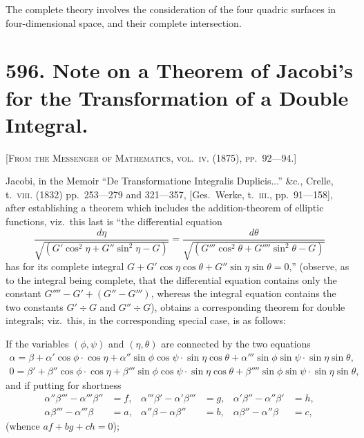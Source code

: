 \documentclass[11pt,a4paper]{book}
\begin{document}
The complete theory involves the consideration of the four quadric surfaces in four-dimensional space, and their complete intersection.

\newpage

\section*{596. Note on a Theorem of Jacobi's for the Transformation of a Double Integral.}

\noindent\textsc{[From the Messenger of Mathematics, vol.~\textsc{iv}. (1875), pp.~92---94.]}

\medskip

\noindent Jacobi, in the Memoir ``De Transformatione Integralis Duplicis...'' \&c., Crelle, t.~\textsc{viii}. (1832) pp.~253---279 and 321---357, [Ges.\ Werke, t.~\textsc{iii}., pp.~91---158], after establishing a theorem which includes the addition-theorem of elliptic functions, viz.\ this last is ``the differential equation
\[
\frac{d\eta}{\sqrt{(G' \cos^2 \eta + G'' \sin^2 \eta - G)}} = \frac{d\theta}{\sqrt{(G''' \cos^2 \theta + G'''' \sin^2 \theta - G)}}
\]
has for its complete integral $G + G' \cos \eta \cos \theta + G'' \sin \eta \sin \theta = 0$,'' (observe, as to the integral being complete, that the differential equation contains only the constant $G'''' - G' + (G'' - G''')$, whereas the integral equation contains the two constants $G' \div G$ and $G'' \div G$), obtains a corresponding theorem for double integrals; viz.\ this, in the corresponding special case, is as follows:

If the variables $(\phi, \psi)$ and $(\eta, \theta)$ are connected by the two equations
\begin{gather*}
\alpha = \beta + \alpha' \cos \phi \cdot \cos \eta + \alpha'' \sin \phi \cos \psi \cdot \sin \eta \cos \theta + \alpha''' \sin \phi \sin \psi \cdot \sin \eta \sin \theta, \\
0 = \beta' + \beta'' \cos \phi \cdot \cos \eta + \beta''' \sin \phi \cos \psi \cdot \sin \eta \cos \theta + \beta'''' \sin \phi \sin \psi \cdot \sin \eta \sin \theta,
\end{gather*}
and if putting for shortness
\begin{align*}
\alpha'' \beta''' - \alpha''' \beta'' &= f, & \alpha''' \beta' - \alpha' \beta''' &= g, & \alpha' \beta'' - \alpha'' \beta' &= h, \\
\alpha \beta''' - \alpha''' \beta &= a, & \alpha'' \beta - \alpha \beta'' &= b, & \alpha \beta'' - \alpha'' \beta &= c,
\end{align*}
(whence $af + bg + ch = 0$);
\end{document}
